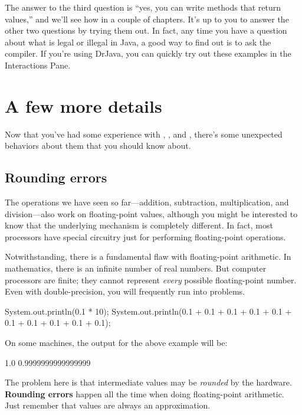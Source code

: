 The answer to the third question is ``yes, you can write methods that return values,'' and we'll see how in a couple of chapters.
It's up to you to answer the other two questions by trying them out.
In fact, any time you have a question about what is legal or illegal in Java, a good way to find out is to ask the compiler.
If you're using DrJava, you can quickly try out these examples in the Interactions Pane.


\section{A few more details}

Now that you've had some experience with , , and , there's some unexpected behaviors about them that you should know about.

\subsection{Rounding errors}


The operations we have seen so far---addition, subtraction, multiplication, and division---also work on floating-point values, although you might be interested to know that the underlying mechanism is completely different.
In fact, most processors have special circuitry just for performing floating-point operations.

Notwithstanding, there is a fundamental flaw with floating-point arithmetic.
In mathematics, there is an infinite number of real numbers.
But computer processors are finite; they cannot represent {\em every} possible floating-point number.
Even with double-precision, you will frequently run into problems.

\begin{code}
    System.out.println(0.1 * 10);
    System.out.println(0.1 + 0.1 + 0.1 + 0.1 + 0.1
                     + 0.1 + 0.1 + 0.1 + 0.1 + 0.1);
\end{code}

On some machines, the output for the above example will be:

\begin{stdout}
    1.0
    0.9999999999999999
\end{stdout}

The problem here is that intermediate values may be {\em rounded} by the hardware.
{\bf Rounding errors} happen all the time when doing floating-point arithmetic.
Just remember that  values are always an approximation.

